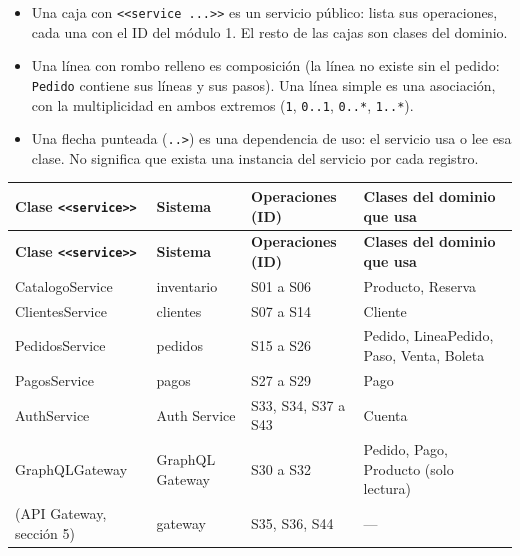 \begin{itemize}[nosep,leftmargin=*]
\item Una caja con \texttt{<<service .\allowbreak{}.\allowbreak{}.\allowbreak{}>>} es un servicio público: lista sus operaciones, cada una con el ID del módulo 1. El resto de las cajas son clases del dominio.
\item Una línea con rombo relleno es composición (la línea no existe sin el pedido: \texttt{Pedido} contiene sus líneas y sus pasos). Una línea simple es una asociación, con la multiplicidad en ambos extremos (\texttt{1}, \texttt{0.\allowbreak{}.\allowbreak{}1}, \texttt{0.\allowbreak{}.\allowbreak{}*}, \texttt{1.\allowbreak{}.\allowbreak{}*}).
\item Una flecha punteada (\texttt{.\allowbreak{}.\allowbreak{}>}) es una dependencia de uso: el servicio usa o lee esa clase. No significa que exista una instancia del servicio por cada registro.
\end{itemize}

{\small
\setlength{\tabcolsep}{3pt}\renewcommand{\arraystretch}{1.15}
\begin{longtable}{|>{\raggedright\arraybackslash}p{}|>{\raggedright\arraybackslash}p{}|>{\raggedright\arraybackslash}p{}|>{\raggedright\arraybackslash}p{}|}
\hline
\textbf{Clase \texttt{<<service>>}} & \textbf{Sistema} & \textbf{Operaciones (ID)} & \textbf{Clases del dominio que usa} \\ \hline
\endfirsthead
\hline
\textbf{Clase \texttt{<<service>>}} & \textbf{Sistema} & \textbf{Operaciones (ID)} & \textbf{Clases del dominio que usa} \\ \hline
\endhead
CatalogoService & inventario & S01 a S06 & Producto, Reserva \\ \hline
ClientesService & clientes & S07 a S14 & Cliente \\ \hline
PedidosService & pedidos & S15 a S26 & Pedido, LineaPedido, Paso, Venta, Boleta \\ \hline
PagosService & pagos & S27 a S29 & Pago \\ \hline
AuthService & Auth Service & S33, S34, S37 a S43 & Cuenta \\ \hline
GraphQLGateway & GraphQL Gateway & S30 a S32 & Pedido, Pago, Producto (solo lectura) \\ \hline
(API Gateway, sección 5) & gateway & S35, S36, S44 & — \\ \hline
\end{longtable}
}

